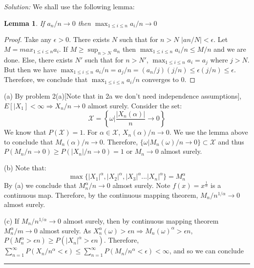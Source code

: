 \documentclass[a4paper, 11pt]{book}
\newenvironment{solution}
    {\textit{Solution:}}
    {}
\newtheorem{lemma}{\textbf{Lemma}}
\begin{document}
\begin{solution} We shall use the following lemma:
    \begin{lemma}
        If $a_n/n\to0$ then $\max_{1\leq i\leq n}a_i/n\to0$
    \end{lemma}
    \begin{proof}
        Take any $\epsilon>0$. There exists $N$ such that for $n>N$ $|an/N|<\epsilon$. Let $M=max_{1\leq i\leq n}a_i$. If $M\geq \sup_{n> N}a_n$ then $\max_{1\leq i\leq n}a_i/n\leq M/n$ and we are done. Else, there exists $N'$ such that for $n>N'$, $\max_{1\leq i\leq n}a_i=a_j$ where $j>N$. But then we have $\max_{1\leq i\leq n}a_i/n=a_j/n=\left(a_n/j\right)\left(j/n\right)\leq \epsilon\left(j/n\right)\leq\epsilon$. Therefore, we conclude that $\max_{1\leq i\leq n}a_i/n$ converges to $0$. 
    \end{proof}
(a) By problem 2(a)[Note that in 2a we don't need independence assumptions], $E\left[|X_1\right]< \infty\Rightarrow X_n/n\to 0$ almost surely. Consider the set:
$$\mathcal{X}=\left\{\omega|\frac{|X_n(\alpha)|}{n}\to 0\right\}$$
We know that $P(\mathcal{X})=1$. For $\alpha\in\mathcal{X}$, $X_n(\alpha)/n\to0$. We use the lemma above to conclude that $M_n(\alpha)/n\to0$. Therefore,
$\{\omega|M_n(\omega)/n\to0\}\subset \mathcal{X}$ and thus $P(M_n/n\to0)\geq P(|X_n|/n\to0)=1$ or $M_n\to0$ almost surely. 
    
(b) Note that:
$$\max\{|X_1|^\alpha,|X_2|^\alpha,|X_3|^\alpha...|X_n|^\alpha\}=M_n^\alpha$$
By (a) we conclude that $M_n^\alpha/n\to 0$ almost surely. Note $f(x)=x^{\frac{1}{\alpha}}$ is a continuous map. Therefore, by the continuous mapping theorem, $M_n/n^{1/\alpha}\to 0$ almost surely.

(c) If $M_n/n^{1/\alpha}\to 0$ almost surely, then by continuous mapping theorem $M_n^\alpha/m\to 0$ almost surely. As
$X_n^\alpha(\omega)>\epsilon n\Rightarrow M_n(\omega)^\alpha>\epsilon n$, $P(M_n^\alpha>\epsilon n)\geq P(|X_n|^\alpha>\epsilon n)$. Therefore, $\sum_{n=1}^\infty P\left(X_n/n^\alpha<\epsilon\right)\leq\sum_{n=1}^\infty P\left(M_n/n^\alpha<\epsilon\right)<\infty$, and so we can conclude 
\end{solution}







\noindent\rule{7in}{2.8pt}
\end{document}
